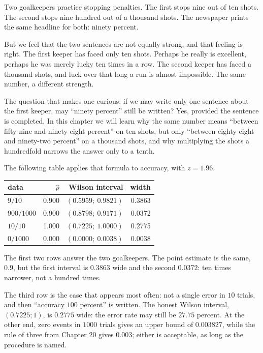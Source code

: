 \begin{untukanak}
Two goalkeepers practice stopping penalties. The first stops nine out of ten shots. The second
stops nine hundred out of a thousand shots. The newspaper prints the same headline for both: ninety
percent.

But we feel that the two sentences are not equally strong, and that feeling is right. The first
keeper has faced only ten shots. Perhaps he really is excellent, perhaps he was merely lucky ten
times in a row. The second keeper has faced a thousand shots, and luck over that long a run is
almost impossible. The same number, a different strength.

The question that makes one curious: if we may write only one sentence about the first keeper, may
``ninety percent'' still be written? Yes, provided the sentence is completed. In this chapter we
will learn why the same number means ``between fifty-nine and ninety-eight percent'' on ten shots,
but only ``between eighty-eight and ninety-two percent'' on a thousand shots, and why multiplying
the shots a hundredfold narrows the answer only to a tenth.

\end{untukanak}

The following table applies that formula to accuracy, with $z=1.96$.

\begin{center}
\small
\begin{tabular}{lrrr}
\hline
data & $\hat p$ & Wilson interval & width \\
\hline
$9/10$ & 0.900 & $(0.5959;\ 0.9821)$ & 0.3863 \\
$900/1000$ & 0.900 & $(0.8798;\ 0.9171)$ & 0.0372 \\
$10/10$ & 1.000 & $(0.7225;\ 1.0000)$ & 0.2775 \\
$0/1000$ & 0.000 & $(0.0000;\ 0.0038)$ & 0.0038 \\
\hline
\end{tabular}
\end{center}

The first two rows answer the two goalkeepers. The point estimate is the same, $0.9$, but the first
interval is $0.3863$ wide and the second $0.0372$: ten times narrower, not a hundred times.

The third row is the case that appears most often: not a single error in $10$ trials, and then
``accuracy $100$ percent'' is written. The honest Wilson interval, $(0.7225;1)$, is $0.2775$ wide:
the error rate may still be $27.75$ percent. At the other end, zero events in $1000$ trials gives an
upper bound of $0.003827$, while the rule of three from Chapter 20 gives $0.003$; either is
acceptable, as long as the procedure is named.

